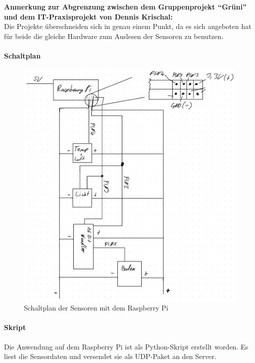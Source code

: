 \textbf{Anmerkung zur Abgrenzung zwischen dem Gruppenprojekt ``Grüni''
und dem IT-Praxisprojekt von Dennis Krischal:}\\
Die Projekte überschneiden sich in genau einem Punkt, da es sich
angeboten hat für beide die gleiche Hardware zum Auslesen der Sensoren
zu benutzen.

\hypertarget{schaltplan}{%
\paragraph{Schaltplan}\label{schaltplan}}

\begin{figure}
\centering
\includegraphics{img/schaltplan.png}
\caption{Schaltplan der Sensoren mit dem Raspberry Pi}
\end{figure}

\hypertarget{skript}{%
\paragraph{Skript}\label{skript}}

Die Anwendung auf dem Raspberry Pi ist als Python-Skript erstellt
worden. Es liest die Sensordaten und versendet sie als UDP-Paket an den
Server.

